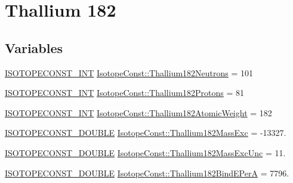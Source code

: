 \hypertarget{group___isotope_const-_thallium-_tl182}{}\section{Thallium 182}
\label{group___isotope_const-_thallium-_tl182}
\subsection*{Variables}
\begin{DoxyCompactItemize}
\item 
\mbox{\hyperlink{group___isotope_const-_macros_ga5f18360b3e99483a35c32d789e62621c}{I\+S\+O\+T\+O\+P\+E\+C\+O\+N\+S\+T\+\_\+\+I\+NT}} \mbox{\hyperlink{group___isotope_const-_thallium-_tl182_gaa7ee87e473ad3431f2871dd041bfe679}{Isotope\+Const\+::\+Thallium182\+Neutrons}} = 101
\item 
\mbox{\hyperlink{group___isotope_const-_macros_ga5f18360b3e99483a35c32d789e62621c}{I\+S\+O\+T\+O\+P\+E\+C\+O\+N\+S\+T\+\_\+\+I\+NT}} \mbox{\hyperlink{group___isotope_const-_thallium-_tl182_ga473d874e5cd9b1ccc34fa555c32c7652}{Isotope\+Const\+::\+Thallium182\+Protons}} = 81
\item 
\mbox{\hyperlink{group___isotope_const-_macros_ga5f18360b3e99483a35c32d789e62621c}{I\+S\+O\+T\+O\+P\+E\+C\+O\+N\+S\+T\+\_\+\+I\+NT}} \mbox{\hyperlink{group___isotope_const-_thallium-_tl182_gab47dae5c78201e47c6fab453265c0fd1}{Isotope\+Const\+::\+Thallium182\+Atomic\+Weight}} = 182
\item 
\mbox{\hyperlink{group___isotope_const-_macros_ga8f45a7272ce02c0b4c65c44636ed719a}{I\+S\+O\+T\+O\+P\+E\+C\+O\+N\+S\+T\+\_\+\+D\+O\+U\+B\+LE}} \mbox{\hyperlink{group___isotope_const-_thallium-_tl182_ga56c5247e4fe373e9bf8adfa1d1c35a10}{Isotope\+Const\+::\+Thallium182\+Mass\+Exc}} = -\/13327.
\item 
\mbox{\hyperlink{group___isotope_const-_macros_ga8f45a7272ce02c0b4c65c44636ed719a}{I\+S\+O\+T\+O\+P\+E\+C\+O\+N\+S\+T\+\_\+\+D\+O\+U\+B\+LE}} \mbox{\hyperlink{group___isotope_const-_thallium-_tl182_gaaa3aa545dceb7bfced59da99093c49c8}{Isotope\+Const\+::\+Thallium182\+Mass\+Exc\+Unc}} = 11.
\item 
\mbox{\hyperlink{group___isotope_const-_macros_ga8f45a7272ce02c0b4c65c44636ed719a}{I\+S\+O\+T\+O\+P\+E\+C\+O\+N\+S\+T\+\_\+\+D\+O\+U\+B\+LE}} \mbox{\hyperlink{group___isotope_const-_thallium-_tl182_ga05208c78ebbfaf04193cdc4ff77c170d}{Isotope\+Const\+::\+Thallium182\+Bind\+E\+PerA}} = 7796.
\item 

\end{DoxyCompactItemize}
